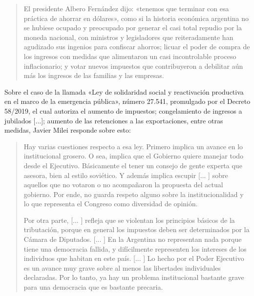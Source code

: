 \documentclass[12pt,a4paper,twoside]{book}
\begin{document}
\begin{quotation}
El presidente Albero Fernández dijo: «tenemos que terminar con esa práctica de ahorrar en dólares», como si la historia económica argentina no se hubiese ocupado y preocupado por generar el casi total repudio por la moneda nacional, con ministros y legisladores que reiteradamente han agudizado sus ingenios para confiscar ahorros; licuar el poder de compra de los ingresos con medidas que alimentaron un casi incontrolable proceso inflacionario; y votar nuevos impuestos que contribuyeron a debilitar aún más los ingresos de las familias y las empresas. \cite{bae:milei-peso}
\end{quotation}

Sobre el caso de la llamada «Ley de solidaridad social y reactivación productiva en el marco de la emergencia pública», número 27.541, promulgado por el Decreto 58/2019, el cual autoriza el aumento de impuestos; congelamiento de ingresos a jubilados [...]; aumento de las retenciones a las exportaciones, entre otras medidas, Javier Milei responde sobre esto:

\begin{quotation}
Hay varias cuestiones respecto a esa ley. Primero implica un avance en lo institucional grosero. O sea, implica que el Gobierno quiere manejar todo desde el Ejecutivo. Básicamente el tener un consejo de gente experta que asesora, bien al estilo soviético. Y además implica escupir [... ] sobre aquellos que no votaron o no acompañaron la propuesta del actual gobierno. Por ende, no guarda respeto alguno sobre la institucionalidad y lo que representa el Congreso como diversidad de opinión.

Por otra parte, [... ] refleja que se violentan los principios básicos de la tributación, porque en general los impuestos deben ser determinados por la Cámara de Diputados. [... ] En la Argentina no representan nada porque tiene una democracia fallida, y difícilmente representen los intereses de los individuos que habitan en este país. [... ] Lo hecho por el Poder Ejecutivo es un avance muy grave sobre al menos las libertades individuales declaradas. Por lo tanto, ya hay un problema institucional bastante grave para una democracia que es bastante precaria. \cite{bae:milei-peso}
\end{quotation}
\end{document}
